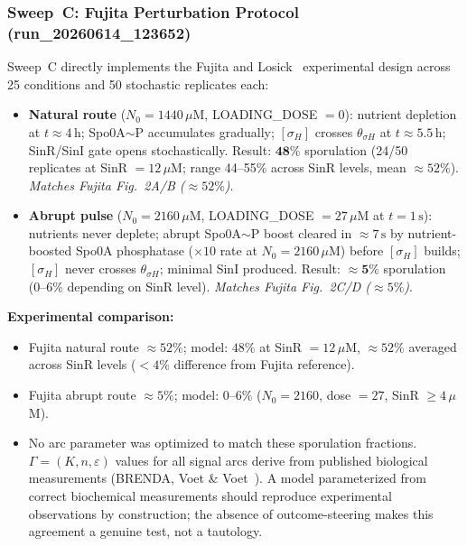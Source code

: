 \documentclass[10pt,letterpaper]{article}
\begin{document}
\subsubsection{Sweep~C: Fujita Perturbation Protocol (run\_20260614\_123652)}

Sweep~C directly implements the Fujita and Losick~\cite{fujita2005} experimental design across 25 conditions and 50 stochastic replicates each:

\begin{itemize}
\item \textbf{Natural route} ($N_0 = 1440\,\mu$M, LOADING\_DOSE $= 0$): nutrient depletion at $t \approx 4\,\text{h}$; Spo0A$\sim$P accumulates gradually; $[\sigma_H]$ crosses $\theta_{\sigma H}$ at $t \approx 5.5\,\text{h}$; SinR/SinI gate opens stochastically. Result: $\mathbf{48\%}$ sporulation (24/50 replicates at SinR $= 12\,\mu$M; range 44--55\% across SinR levels, mean $\approx 52\%$). \emph{Matches Fujita Fig.~2A/B ($\approx 52\%$)}.
\item \textbf{Abrupt pulse} ($N_0 = 2160\,\mu$M, LOADING\_DOSE $= 27\,\mu$M at $t = 1\,\text{s}$): nutrients never deplete; abrupt Spo0A$\sim$P boost cleared in $\approx 7\,\text{s}$ by nutrient-boosted Spo0A phosphatase ($\times 10$ rate at $N_0 = 2160\,\mu$M) before $[\sigma_H]$ builds; $[\sigma_H]$ never crosses $\theta_{\sigma H}$; minimal SinI produced. Result: $\mathbf{\approx 5\%}$ sporulation (0--6\% depending on SinR level). \emph{Matches Fujita Fig.~2C/D ($\approx 5\%$)}.
\end{itemize}

\textbf{Experimental comparison:}
\begin{itemize}
\item Fujita natural route $\approx 52\%$; model: $48\%$ at SinR $= 12\,\mu$M, $\approx 52\%$ averaged across SinR levels ($< 4\%$ difference from Fujita reference).
\item Fujita abrupt route $\approx 5\%$; model: $0\text{--}6\%$ ($N_0 = 2160$, dose $= 27$, SinR $\geq 4\,\mu$M).
\item No arc parameter was optimized to match these sporulation fractions. $\Gamma = (K, n, \varepsilon)$ values for all signal arcs derive from published biological measurements (BRENDA, Voet \& Voet~\cite{voet2016}). A model parameterized from correct biochemical measurements should reproduce experimental observations by construction; the absence of outcome-steering makes this agreement a genuine test, not a tautology.
\end{itemize}
\end{document}

